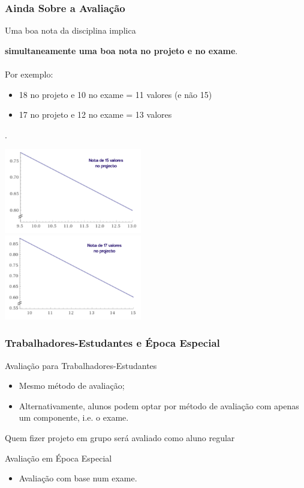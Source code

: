 \documentclass{beamer}
\begin{document}
\begin{frame}
  \frametitle{Ainda Sobre a Avaliação}
  \begin{block}{}
  Uma boa nota da disciplina implica {{\bf simultaneamente uma boa nota no projeto e no exame}.
  ~\\~\\
  Por exemplo:
  
 \begin{itemize}
 \item 18 no projeto e 10 no exame = 11 valores (e não 15)
 \item 17 no projeto e 12 no exame = 13 valores
 \end{itemize}
  }.
  \end{block}
  \begin{center}
    \includegraphics[width=0.45\textwidth]{15.png} ~~~~~~~
    \includegraphics[width=0.45\textwidth]{17.png}
  \end{center}
\end{frame}


\begin{frame} 
    \frametitle{Trabalhadores-Estudantes e Época Especial} 
   \begin{block}{Avaliação para Trabalhadores-Estudantes}
   \begin{itemize}
    \item Mesmo método de avaliação;
	\item Alternativamente, alunos podem optar por método de avaliação com apenas um componente, i.e. o exame.
   \end{itemize}
   Quem fizer projeto em grupo será avaliado como aluno regular
   \end{block}
   \begin{block}{Avaliação em Época Especial}
   \begin{itemize}
   \item Avaliação com base num exame.
   \end{itemize}
   \end{block}
\end{frame}
\end{document}

